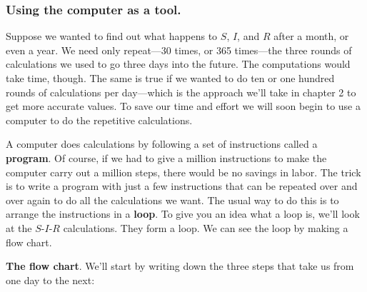 \subsubsection{Using the computer as a tool.}
Suppose we wanted to find out
what happens to $S$, $I$, and $R$ after a month, or even a year.  We
need only repeat---30 times, or 365 times---the three rounds of
calculations we used to go three days into the future.  The
computations would take time, though.  The same is true if we wanted
to do ten or one hundred rounds of calculations per day---which is the
approach we'll take in chapter 2 to get more accurate values.  To save
our time and effort we will soon begin to use a computer to do the
repetitive calculations.

\enlargethispage*{10pt}
A computer does calculations by following a set of instructions called
a {\bf program}. Of course, if we had to give a million
instructions to make the computer carry out a million steps, there
would be no savings in labor.  The trick is to write a program with
just a few instructions that can be repeated over and over again to do
all the calculations we want.  The usual way to do this is to arrange
the instructions in a {\bf loop}\label{`loop'}.  To give
you an idea what a loop is, we'll look at the $S$-$I$-$R$
calculations.  They form a loop.  We can see the loop by making a flow
chart.


{\bf The flow chart}. We'll start by writing down
the three steps that take us from one day to the next:


